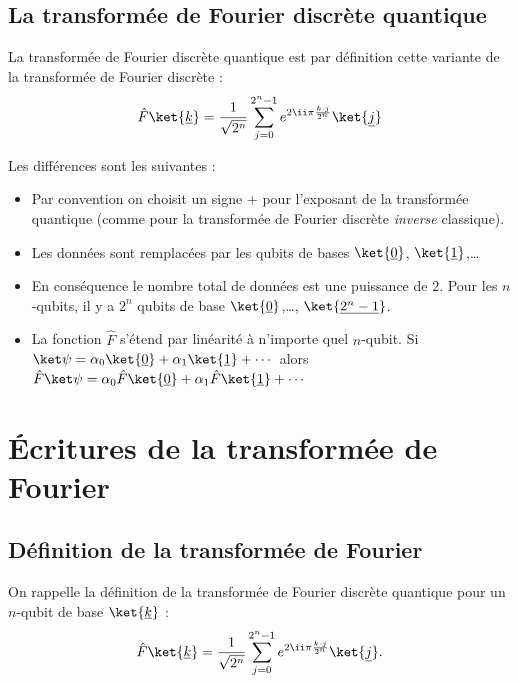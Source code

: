 \documentclass[11pt,class=report,crop=false]{standalone}
\begin{document}
\subsection{La transformée de Fourier discrète quantique}

La transformée de Fourier discrète quantique est par définition cette variante de la transformée de Fourier discrète :
$$\hat F \ket{\underline k} = \frac{1}{\sqrt{2^n}} \sum_{j=0}^{2^n-1} e^{2\ii \pi \frac{k \cdot j}{2^n}} \ket{\underline j}$$

Les différences sont les suivantes :
\begin{itemize}
  \item Par convention on choisit un signe \og{}$+$\fg{} pour l'exposant de la transformée quantique (comme pour la transformée de Fourier discrète \emph{inverse} classique).

  \item Les données sont remplacées par les qubits de bases $\ket{\underline{0}}$, $\ket{\underline{1}}$,\ldots 

  \item En conséquence le nombre total de données est une puissance de $2$.
  Pour les $n$-qubits, il y a $2^n$ qubits de base $\ket{\underline{0}}$,\ldots, $\ket{\underline{2^{n}-1}}$.

  \item La fonction $\hat F$ s'étend par linéarité à n'importe quel $n$-qubit.
  Si $\ket\psi = \alpha_0\ket{\underline{0}}  + \alpha_1\ket{\underline{1}} + \cdots$ alors
  $\hat F \ket\psi = \alpha_0\hat F \ket{\underline 0} + \alpha_1\hat F\ket{\underline{1}} + \cdots $

\end{itemize}

\section{\'Ecritures de la transformée de Fourier}

\subsection{Définition de la transformée de Fourier}

On rappelle la définition de la transformée de Fourier discrète quantique pour un $n$-qubit de base $\ket{\underline k}$ :
\begin{equation}
\label{eq:deffourier}
\hat F \ket{\underline k} = \frac{1}{\sqrt{2^n}} \sum_{j=0}^{2^n-1} e^{2\ii \pi \frac{k \cdot j}{2^n}} \ket{\underline j}.
\end{equation}
\end{document}
